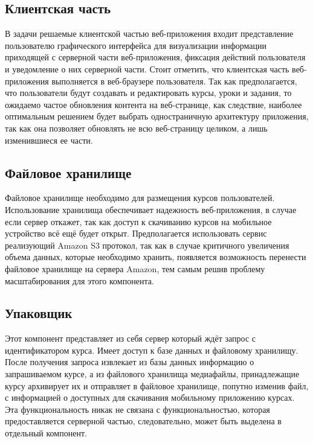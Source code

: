 \documentclass[%
  a5paper,
  subf,
  href,
  master,
  dotsinheaders 
]{csse-fcs}
\begin{document}
\subsection{Клиентская часть}

В задачи решаемые клиентской частью веб-приложения входит представление пользователю графического интерфейса для визуализации информации приходящей с серверной части веб-приложения, фиксация действий пользователя и уведомление о них серверной части. Стоит отметить, что клиентская часть веб-приложения выполняется в веб-браузере пользователя. Так как предполагается, что пользователи будут создавать и редактировать курсы, уроки и задания, то ожидаемо частое обновления контента на веб-странице, как следствие, наиболее оптимальным решением будет выбрать одностраничную архитектуру приложения, так как она позволяет обновлять не всю веб-страницу целиком, а лишь изменившиеся ее части.

\subsection{Файловое хранилище}

Файловое хранилище необходимо для размещения курсов пользователей. Использование хранилища обеспечивает надежность веб-приложения, в случае если сервер откажет, так как доступ к скачиванию курсов на мобильное устройство всё ещё будет открыт. Предполагается использовать сервис реализующий Amazon S3 протокол, так как в случае критичного увеличения объема данных, которые необходимо хранить, появляется возможность перенести файловое хранилище на сервера Amazon, тем самым решив проблему масштабирования для этого компонента.

\subsection{Упаковщик}

Этот компонент представляет из себя сервер который ждёт запрос с идентификатором курса. Имеет доступ к базе данных и файловому хранилищу.  После получения запроса извлекает из базы данных информацию о запрашиваемом курсе, а из файлового хранилища медиафайлы, принадлежащие курсу архивирует их и отправляет в файловое хранилище, попутно изменив файл, с информацией о доступных для скачивания мобильному приложению курсах. Эта функциональность никак не связана с функциональностью, которая предоставляется серверной частью, следовательно, может быть выделена в отдельный компонент.
\end{document}
